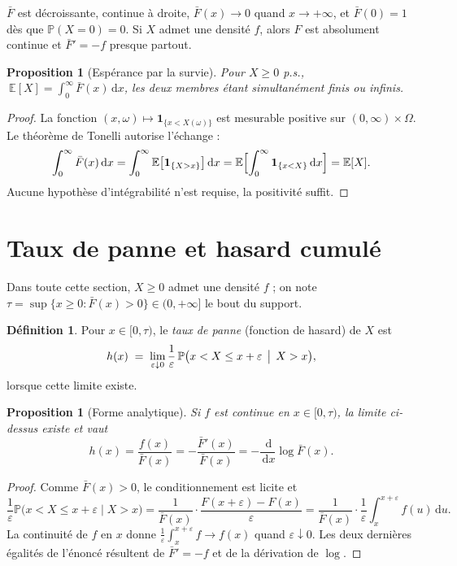 \documentclass[11pt,a4paper]{article}
\theoremstyle{plain}
\newtheorem{proposition}[theoreme]{Proposition}
\theoremstyle{definition}
\newtheorem{definition}[theoreme]{Définition}
\theoremstyle{remark}
\newcommand{\E}{\mathbb{E}}
\newcommand{\Prob}{\mathbb{P}}
\newcommand{\barF}{\bar{F}}
\newcommand{\dd}{\,\mathrm{d}}
\begin{document}
$\barF$ est décroissante, continue à droite, $\barF(x)\to 0$ quand
$x\to+\infty$, et $\barF(0)=1$ dès que $\Prob(X=0)=0$. Si $X$ admet une densité
$f$, alors $F$ est absolument continue et $\barF'=-f$ presque partout.

\begin{proposition}[Espérance par la survie]
Pour $X\ge 0$ p.s., $\ \E[X]=\displaystyle\int_0^{\infty}\barF(x)\dd x$, les deux
membres étant simultanément finis ou infinis.
\end{proposition}

\begin{proof}
La fonction $(x,\omega)\mapsto \mathbf 1_{\{x<X(\omega)\}}$ est mesurable positive
sur $(0,\infty)\times\Omega$. Le théorème de Tonelli autorise l'échange :
\[
\int_0^\infty \barF(x)\dd x
=\int_0^\infty \E\bigl[\mathbf 1_{\{X>x\}}\bigr]\dd x
=\E\Bigl[\int_0^\infty \mathbf 1_{\{x<X\}}\dd x\Bigr]
=\E[X].
\]
Aucune hypothèse d'intégrabilité n'est requise, la positivité suffit.
\end{proof}

\section{Taux de panne et hasard cumulé}

Dans toute cette section, $X\ge0$ admet une densité $f$ ; on note
$\tau=\sup\{x\ge0:\barF(x)>0\}\in(0,+\infty]$ le bout du support.

\begin{definition}
Pour $x\in[0,\tau)$, le \emph{taux de panne} (fonction de hasard) de $X$ est
\[
h(x)\;=\;\lim_{\varepsilon\downarrow 0}\frac1\varepsilon\,
\Prob\bigl(x<X\le x+\varepsilon \,\bigm|\, X>x\bigr),
\]
lorsque cette limite existe.
\end{definition}

\begin{proposition}[Forme analytique]
Si $f$ est continue en $x\in[0,\tau)$, la limite ci-dessus existe et vaut
\[
h(x)=\frac{f(x)}{\barF(x)}=-\frac{\barF'(x)}{\barF(x)}=-\frac{\dd}{\dd x}\log\barF(x).
\]
\end{proposition}

\begin{proof}
Comme $\barF(x)>0$, le conditionnement est licite et
\[
\frac1\varepsilon\Prob\bigl(x<X\le x+\varepsilon\mid X>x\bigr)
=\frac{1}{\barF(x)}\cdot\frac{F(x+\varepsilon)-F(x)}{\varepsilon}
=\frac{1}{\barF(x)}\cdot\frac1\varepsilon\int_x^{x+\varepsilon} f(u)\dd u .
\]
La continuité de $f$ en $x$ donne $\frac1\varepsilon\int_x^{x+\varepsilon}f\to f(x)$
quand $\varepsilon\downarrow0$. Les deux dernières égalités de l'énoncé résultent
de $\barF'=-f$ et de la dérivation de $\log$.
\end{proof}
\end{document}
